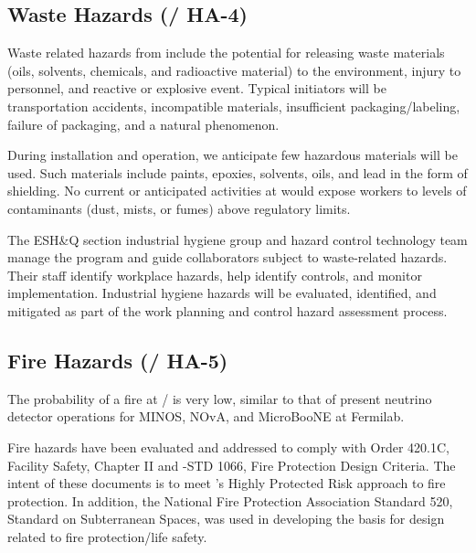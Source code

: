 \subsection{Waste Hazards (/ HA-4)}

Waste related hazards from  include the potential for releasing
waste materials (oils, solvents, chemicals, and radioactive material)
to the environment, injury to personnel, and reactive or
explosive event. Typical initiators will be transportation accidents,
incompatible materials, insufficient packaging/labeling, failure of
packaging, and a natural phenomenon.

During installation and  operation, we anticipate 
few hazardous materials will be used. Such materials
include paints, epoxies, solvents, oils, and lead in the form of
shielding. No current or anticipated activities at  
would expose workers to levels of contaminants (dust, mists, or fumes)
above regulatory limits.

The ESH\&Q section industrial hygiene group and hazard control
technology team manage the program and guide 
collaborators subject to
waste-related hazards.  Their staff identify workplace
hazards, help identify controls, and monitor
implementation. Industrial hygiene hazards will be evaluated,
identified, and mitigated as part of the work planning and control
hazard assessment process.

\subsection{Fire Hazards (/ HA-5)}

The probability of a fire at / is very low,
similar to that of present neutrino detector operations for MINOS,
NOvA, and MicroBooNE at Fermilab.


Fire hazards have been evaluated and addressed to comply with 
Order 420.1C, Facility Safety, Chapter II and -STD 1066, Fire
Protection Design Criteria.  The intent of these documents is to meet
's Highly Protected Risk approach to fire protection.  In
addition, the National Fire Protection Association Standard
520, Standard on Subterranean Spaces, was used in developing the
basis for design related to fire protection/life safety.

